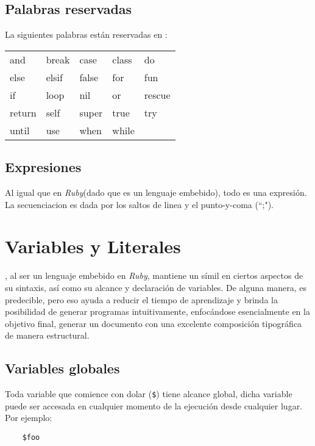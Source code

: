 \documentclass[12pt,letterpaper,titlepage,oneside,openright]{book}
\newcommand{\OhTeX}{%
    \makebox[0.76em][c]{O}%
    \makebox[0.25em][c]{%
        \raisebox{0.14em}[0em][0em]{%
            \fontsize{0.5em}{0cm}%
                \selectfont H%
        }%
    }%
    \makebox[1.35em][c]{\TeX}%
}
\newcommand{\ohtex}{\OhTeX\xspace}
\newcommand{\ruby}{\textit{Ruby}\xspace}
\newcommand{\ttcode}[1]{(\texttt{#1})}
\begin{document}
\subsection{Palabras reservadas}

La siguientes palabras están reservadas en \ohtex:

\begin{center}
\ttfamily
\begin{tabular}{ l l l l l }
and & break & case & class & do \\
else & elsif & false & for & fun \\
if & loop & nil & or & rescue \\
return & self & super & true & try \\
until & use & when & while & \\
\end{tabular}
\end{center}

\subsection{Expresiones}

Al igual que en \ruby (dado que es un lenguaje embebido), todo es una expresión.
La secuenciacion es dada por los saltos de linea y el punto-y-coma (``;").

\section{Variables y Literales}

\ohtex, al ser un lenguaje embebido en \ruby, mantiene un símil en ciertos
aspectos de su sintaxis, así como su alcance y declaración de variables. De
alguna manera, es predecible, pero eso ayuda a reducir el tiempo de aprendizaje
y brinda la posibilidad de generar programas intuitivamente, enfocándose
esencialmente en la objetivo final, generar un documento con una excelente
composición tipográfica de manera estructural.

\subsection{Variables globales}

Toda variable que comience con dolar \ttcode{\$} tiene alcance global, dicha
variable puede ser accesada en cualquier momento de la ejecución desde cualquier
lugar. Por ejemplo:

\begin{center}
\begin{minipage}{\linewidth}
\begin{lstlisting}
    $foo
\end{lstlisting}
\end{minipage}
\end{center}
\end{document}
